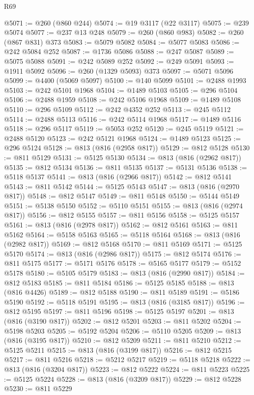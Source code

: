 \begin{lexlean}{R69}
\begin{coremodule}
{@5071 := @260 (@860 @244)
@5074 := @19 @3117 (@22 @3117)
@5075 := @239 @5074
@5077 := @237 @13 @248
@5079 := @260 (@860 @983)
@5082 := @260 (@867 @831) @373
@5083 := @5079 @5082
@5084 := @5077 @5083
@5086 := @242 @5084 @252
@5087 := @1736 @5086
@5088 := @247 @5087
@5089 := @5075 @5088
@5091 := @242 @5089 @252
@5092 := @249 @5091
@5093 := @1911 @5092
@5096 := @260 (@1329 @5093) @373
@5097 := @5071 @5096
@5099 := @4400 (@5069 @5097)
@5100 := @140 @5099
@5101 := @2488 @1993
@5103 := @242 @5101 @1968
@5104 := @1489 @5103
@5105 := @296 @5104
@5106 := @2488 @1959
@5108 := @242 @5106 @1968
@5109 := @1489 @5108
@5110 := @296 @5109
@5112 := @242 @4352 @252
@5113 := @245 @5112
@5114 := @2488 @5113
@5116 := @242 @5114 @1968
@5117 := @1489 @5116
@5118 := @296 @5117
@5119 := @5053 @252
@5120 := @245 @5119
@5121 := @2488 @5120
@5123 := @242 @5121 @1968
@5124 := @1489 @5123
@5125 := @296 @5124
@5128 := @813 (@816 (@2958 @817))
@5129 := @812 @5128
@5130 := @811 @5129
@5131 := @5125 @5130
@5134 := @813 (@816 (@2962 @817))
@5135 := @812 @5134
@5136 := @811 @5135
@5137 := @5131 @5136
@5138 := @5118 @5137
@5141 := @813 (@816 (@2966 @817))
@5142 := @812 @5141
@5143 := @811 @5142
@5144 := @5125 @5143
@5147 := @813 (@816 (@2970 @817))
@5148 := @812 @5147
@5149 := @811 @5148
@5150 := @5144 @5149
@5151 := @5138 @5150
@5152 := @5110 @5151
@5155 := @813 (@816 (@2974 @817))
@5156 := @812 @5155
@5157 := @811 @5156
@5158 := @5125 @5157
@5161 := @813 (@816 (@2978 @817))
@5162 := @812 @5161
@5163 := @811 @5162
@5164 := @5158 @5163
@5165 := @5118 @5164
@5168 := @813 (@816 (@2982 @817))
@5169 := @812 @5168
@5170 := @811 @5169
@5171 := @5125 @5170
@5174 := @813 (@816 (@2986 @817))
@5175 := @812 @5174
@5176 := @811 @5175
@5177 := @5171 @5176
@5178 := @5165 @5177
@5179 := @5152 @5178
@5180 := @5105 @5179
@5183 := @813 (@816 (@2990 @817))
@5184 := @812 @5183
@5185 := @811 @5184
@5186 := @5125 @5185
@5188 := @813 (@816 @4426)
@5189 := @812 @5188
@5190 := @811 @5189
@5191 := @5186 @5190
@5192 := @5118 @5191
@5195 := @813 (@816 (@3185 @817))
@5196 := @812 @5195
@5197 := @811 @5196
@5198 := @5125 @5197
@5201 := @813 (@816 (@3190 @817))
@5202 := @812 @5201
@5203 := @811 @5202
@5204 := @5198 @5203
@5205 := @5192 @5204
@5206 := @5110 @5205
@5209 := @813 (@816 (@3195 @817))
@5210 := @812 @5209
@5211 := @811 @5210
@5212 := @5125 @5211
@5215 := @813 (@816 (@3199 @817))
@5216 := @812 @5215
@5217 := @811 @5216
@5218 := @5212 @5217
@5219 := @5118 @5218
@5222 := @813 (@816 (@3204 @817))
@5223 := @812 @5222
@5224 := @811 @5223
@5225 := @5125 @5224
@5228 := @813 (@816 (@3209 @817))
@5229 := @812 @5228
@5230 := @811 @5229
}
\end{coremodule}
\end{lexlean}
